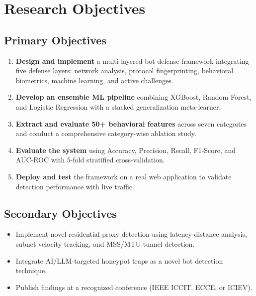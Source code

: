 \documentclass[12pt, a4paper]{article}
\begin{document}
\section{Research Objectives}

\subsection{Primary Objectives}
\begin{enumerate}[leftmargin=*, label=\textbf{O\arabic*.}]
    \item \textbf{Design and implement} a multi-layered bot defense framework integrating five defense layers: network analysis, protocol fingerprinting, behavioral biometrics, machine learning, and active challenges.
    \item \textbf{Develop an ensemble ML pipeline} combining XGBoost, Random Forest, and Logistic Regression with a stacked generalization meta-learner.
    \item \textbf{Extract and evaluate 50+ behavioral features} across seven categories and conduct a comprehensive category-wise ablation study.
    \item \textbf{Evaluate the system} using Accuracy, Precision, Recall, F1-Score, and AUC-ROC with 5-fold stratified cross-validation.
    \item \textbf{Deploy and test} the framework on a real web application to validate detection performance with live traffic.
\end{enumerate}

\subsection{Secondary Objectives}
\begin{itemize}[leftmargin=*]
    \item Implement novel residential proxy detection using latency-distance analysis, subnet velocity tracking, and MSS/MTU tunnel detection.
    \item Integrate AI/LLM-targeted honeypot traps as a novel bot detection technique.
    \item Publish findings at a recognized conference (IEEE ICCIT, ECCE, or ICIEV).
\end{itemize}

\end{document}
